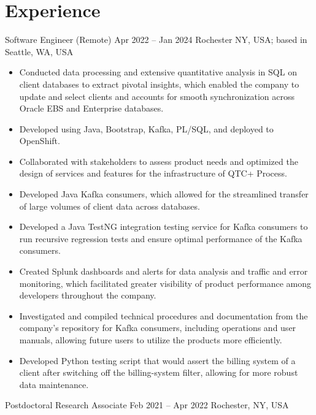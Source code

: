 \section{Experience}
\cventry{}%
{\PYX}%
{Software Engineer (Remote)}%
{Apr 2022 -- Jan 2024}%
{Rochester NY, USA; based in Seattle, WA, USA}%
{%
\begin{itemize}
    \item Conducted data processing and extensive quantitative analysis in SQL on client databases to extract pivotal insights, which enabled the company to update and select clients and accounts for smooth synchronization across Oracle EBS and Enterprise databases.
    \item Developed using Java, Bootstrap, Kafka, PL/SQL, and deployed to OpenShift.
    \item Collaborated with stakeholders to assess product needs and optimized the design of services and features for the infrastructure of QTC+ Process.
    \item Developed Java Kafka consumers, which allowed for the streamlined transfer of large volumes of client data across databases.
    \item Developed a Java TestNG integration testing service for Kafka consumers to run recursive regression tests and ensure optimal performance of the Kafka consumers.
    \item Created Splunk dashboards and alerts for data analysis and traffic and error monitoring, which facilitated greater visibility of product performance among developers throughout the company.
    \item Investigated and compiled technical procedures and documentation from the company's repository for Kafka consumers, including operations and user manuals, allowing future users to utilize the products more efficiently.
    \item Developed Python testing script that would assert the billing system of a client after switching off the billing-system filter, allowing for more robust data maintenance.
\end{itemize}
}
\cventry{}%
{\RIT}%
{Postdoctoral Research Associate}%
{Feb 2021 -- Apr 2022}%
{Rochester, NY, USA}%
